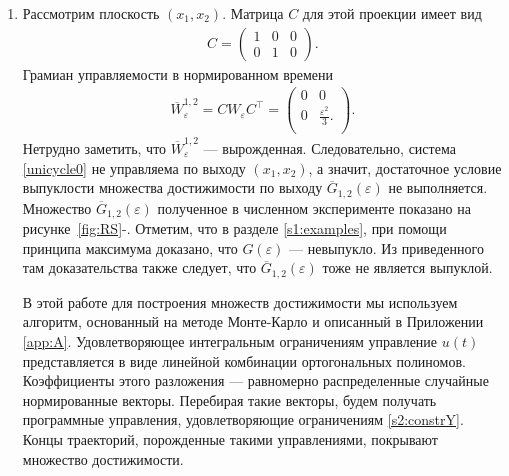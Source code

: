 \documentclass[../main.tex]{subfiles}
\begin{document}
 \begin{enumerate}
 \item Рассмотрим плоскость $ (x_1, x_2) $. 
Матрица $ C $ для этой проекции имеет вид
 \begin{gather*}
 C = \begin{pmatrix}
 1 & 0 & 0 \\
 0 & 1 & 0
 \end{pmatrix}.
 \end{gather*}
 Грамиан управляемости в нормированном времени
 \begin{gather*}
 \overline{W}_{\varepsilon}^{1,2} = C W_{\varepsilon} C^{\top} =\begin{pmatrix}
 0 & 0 \\
 0 & \frac{\varepsilon^2}{3}. \\
 \end{pmatrix}.
 \end{gather*}
 Нетрудно заметить, что $ \overline{W}_{\varepsilon}^{1,2} $ --- вырожденная. 
Следовательно, система \eqref{unicycle0} не управляема по выходу $ (x_1, x_2) $, а значит, достаточное условие выпуклости множества достижимости по выходу $ \overline{G}_{1,2}(\varepsilon) $ не выполняется. 
Множество $ \overline{G}_{1,2}(\varepsilon) $ полученное в численном эксперименте показано на рисунке~\ref{fig:RS}-. 
Отметим, что в разделе \ref{s1:examples}, при помощи принципа максимума доказано, что $ G(\varepsilon) $ --- невыпукло. 
Из приведенного там доказательства также следует, что $ \overline{G}_{1,2}(\varepsilon) $ тоже не является выпуклой.
 
В этой работе для построения множеств достижимости мы используем алгоритм, основанный на методе Монте-Карло и описанный в Приложении \ref{app:A}.
Удовлетворяющее интегральным ограничениям управление $ u(t) $ представляется в виде линейной комбинации ортогональных полиномов. 
Коэффициенты этого разложения --- равномерно распределенные случайные нормированные векторы. 
Перебирая такие векторы, будем получать программные управления, удовлетворяющие ограничениям \eqref{s2:constrY}. 
Концы траекторий, порожденные такими управлениями, покрывают множество достижимости.
 

\end{enumerate}
\end{document}
